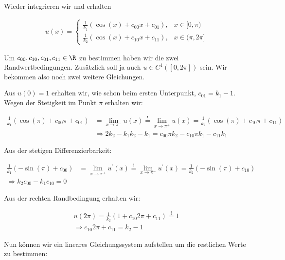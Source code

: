 \begin{solution}
\begin{itemize}
    Wieder integrieren wir und erhalten

    \begin{align*}
      u(x)
      =
      \begin{cases}
        \frac{1}{k_1}(\cos(x) + c_{00}x + c_{01}), & x \in [0,\pi) \\
        \frac{1}{k_2}(\cos(x) + c_{10}x + c_{11}), & x \in (\pi, 2\pi]
      \end{cases}
    \end{align*}

    Um $c_{00}, c_{10}, c_{01}, c_{11} \in \R$ zu bestimmen haben wir die zwei
    Randwertbedingungen. Zusätzlich soll ja auch $u \in C^1([0,2\pi])$ sein. Wir
    bekommen also noch zwei weitere Gleichungen.

    Aus $u(0)= 1$ erhalten wir, wie schon beim ersten Unterpunkt, $c_{01} = k_1-1$. \\
    Wegen der Stetigkeit im Punkt $\pi$ erhalten wir:

    \begin{align*}
      \frac{1}{k_1}(\cos(\pi) + c_{00}\pi + c_{01})
      &=
      \lim_{x \rightarrow \pi^-} u(x)
      \stackrel{!}{=}
      \lim_{x \rightarrow \pi^+} u(x)
      =
      \frac{1}{k_2}(\cos(\pi)+ c_{10}\pi + c_{11}) \\
      &\Rightarrow
      2k_2 -k_1 k_2 -k_1 = c_{00}\pi k_2 - c_{10}\pi k_1 - c_{11} k_1
    \end{align*}

    Aus der stetigen Differenzierbarkeit:

    \begin{align*}
        \frac{1}{k_1}(-\sin(\pi) + c_{00})
        &=
        \lim_{x \rightarrow \pi^+} u^\prime(x)
        \stackrel{!}{=}
        \lim_{x \rightarrow \pi^-} u^\prime(x)
        =
        \frac{1}{k_2}(-\sin(\pi)+ c_{10}) \\
        \Rightarrow
        k_2 c_{00}- k_1 c_{10} = 0
    \end{align*}

    Aus der rechten Randbedingung erhalten wir:

    \begin{align*}
      u(2\pi)
      =
      \frac{1}{k_2}(1 + c_{10}2\pi + c_{11})
      \stackrel{!}{=}
      1 \\
      \Rightarrow
      c_{10}2\pi +c_{11} = k_2 - 1
    \end{align*}

    Nun können wir ein lineares Gleichungssystem aufstellen um die restlichen
    Werte zu bestimmen:


\end{itemize}
\end{solution}
